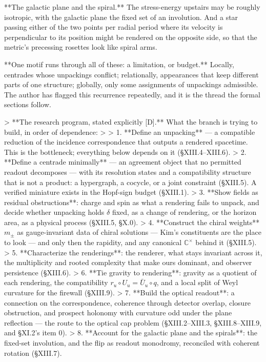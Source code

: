 **The galactic plane and the spiral.** The stress-energy upstairs may be roughly isotropic, with the galactic plane the fixed set of an involution. And a star passing either of the two points per radial period where its velocity is perpendicular to its position might be rendered on the opposite side, so that the metric's precessing rosettes look like spiral arms.

**One motif runs through all of these: a limitation, or budget.** Locally, centrades whose unpackings conflict; relationally, appearances that keep different parts of one structure; globally, only some assignments of unpackings admissible. The author has flagged this recurrence repeatedly, and it is the thread the formal sections follow.


> **The research program, stated explicitly [D].** What the branch is trying to build, in order of dependence:
>
> 1. **Define an unpacking** — a compatible reduction of the incidence correspondence that outputs a rendered spacetime. This is the bottleneck; everything below depends on it (§XIII.4–XIII.6).
> 2. **Define a centrade minimally** — an agreement object that no permitted readout decomposes — with its resolution states and a compatibility structure that is not a product: a hypergraph, a cocycle, or a joint constraint (§XIII.5). A verified miniature exists in the Hopf-sign budget (§XIII.1).
> 3. **Show fields as residual obstructions**: charge and spin as what a rendering fails to unpack, and decide whether unpacking holds $\delta$ fixed, as a change of rendering, or the horizon area, as a physical process (§XIII.5, §X.0).
> 4. **Construct the chiral weights** $m_\pm$ as gauge-invariant data of chiral solutions — Kim's constituents are the place to look — and only then the rapidity, and any canonical $\mathbb{C}^\times$ behind it (§XIII.5).
> 5. **Characterize the renderings**: the renderer, what stays invariant across it, the multiplicity and rooted complexity that make ours dominant, and observer persistence (§XIII.6).
> 6. **Tie gravity to rendering**: gravity as a quotient of each rendering, the compatibility $r_u\circ U_u = \bar U_u\circ q$, and a local split of Weyl curvature for the firewall (§XIII.9).
> 7. **Build the optical readout**: a connection on the correspondence, coherence through detector overlap, closure obstruction, and prospect holonomy with curvature odd under the plane reflection — the route to the optical cap problem (§XIII.2–XIII.3, §XIII.8–XIII.9, and §XI.2's item 0).
> 8. **Account for the galactic plane and the spirals**: the fixed-set involution, and the flip as readout monodromy, reconciled with coherent rotation (§XIII.7).
